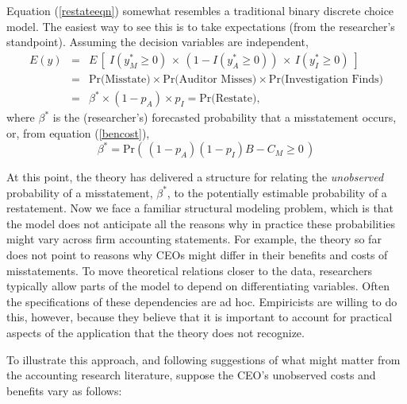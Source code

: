 \documentclass[12pt,reqno,titlepage]{amsart}
\theoremstyle{definition}
\begin{document}
\begin{doublespace}
Equation (\ref{restateeqn}) somewhat resembles a traditional binary discrete choice model. The easiest
way to see this is to take expectations (from the researcher's standpoint).
Assuming the decision variables are independent,
\begin{equation} \label{equilpr}
\begin{array}{lcl}
 E(y) & = & E\, \left[\; I(y^*_M \ge 0) \, \times\, (1 - I(y^*_A \ge 0)) \, \times\, I(y^*_I \ge 0) \; \right]\\[1em]
 & = &  \mbox{Pr(Misstate)} \times \mbox{Pr(Auditor Misses)} \times
\mbox{Pr(Investigation Finds)}\\[1em]
& = & \beta^* \times (1-p_A) \times p_{I} = \mbox{Pr(Restate)} ,
\end{array}\end{equation}
where $\beta^*$ is the (researcher's) forecasted probability that a misstatement occurs, or, from equation (\ref{bencost}),
\begin{equation}\label{betaplus}
\beta^*= \mbox{Pr}\left(\, (1 - p_A)(1 - p_I) B - C_M \ge 0 \,\right)
\end{equation}

At this point, the theory has delivered a structure for relating the \emph{unobserved} probability of a misstatement, $\beta^*$, to the potentially estimable probability of a restatement.
Now we face a familiar structural modeling problem, which is that the model does not anticipate all the reasons why in practice these probabilities might vary across firm accounting statements.
For example, the theory so far does not point to reasons why CEOs might differ in their benefits and costs of misstatements. 
To move theoretical relations closer to the data, researchers typically allow parts of the model to depend on differentiating variables.
Often the specifications of these dependencies are ad hoc. 
Empiricists are willing to do this, however, because they believe that it is important to account for practical aspects of the application that the theory does not recognize.

To illustrate this approach, and following suggestions of what might matter from the
accounting research literature, suppose the CEO's unobserved costs and benefits vary as follows:


\end{doublespace}
\end{document}
